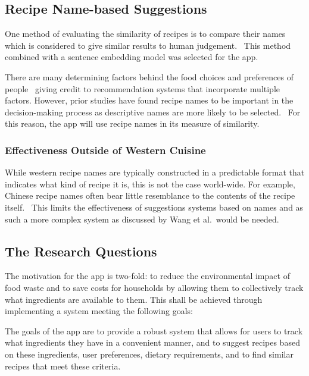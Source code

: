 \subsection{Recipe Name-based Suggestions}\label{sec:recipe_name_suggestions}

One method of evaluating the similarity of recipes is to compare their names which is considered to
give similar results to human judgement.~\cite{trattner_learning_2020,starke_serving_2021} This method
combined with a sentence embedding model was selected for the \chef{} app.

There are many determining factors behind the food choices and preferences of people~\cite{leng_determinants_2017,franchi_food_2012}
giving credit to recommendation systems that incorporate multiple factors. However, prior studies have
found recipe names to be important in the decision-making process as descriptive names are more likely to be
selected.~\cite{ohlhausen_when_2020} For this reason, the \chef{} app will use recipe names in its measure of similarity.

\subsubsection{Effectiveness Outside of Western Cuisine}
While western recipe names are typically constructed in a predictable format
that indicates what kind of recipe it is, this is not the case world-wide.
For example, Chinese recipe names often bear little resemblance to the contents
of the recipe itself.~\cite{wang_substructure_2008} This limits the effectiveness
of suggestions systems based on names and as such a more complex system as discussed
by Wang et al.\ would be needed.

\subsection{The Research Questions}

The motivation for the \chef{} app is two-fold: to reduce the environmental impact of food waste and to
save costs for households by allowing them to collectively track what ingredients are available to them.
This shall be achieved through implementing a system meeting the following goals:

The goals of the \chef{} app are to provide a robust system that allows for users to track what ingredients they have in a
convenient manner, and to suggest recipes based on these ingredients, user preferences, dietary requirements, and to find
similar recipes that meet these criteria.

